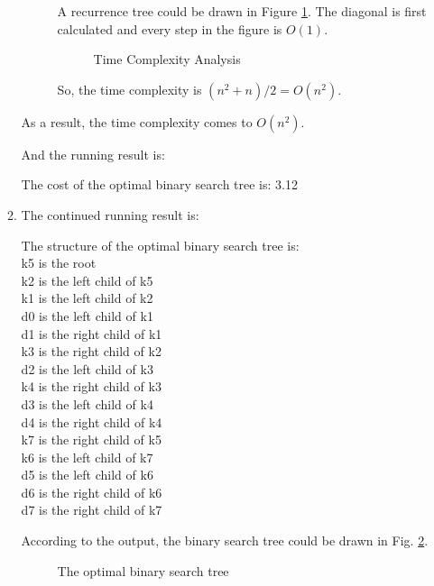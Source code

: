 \documentclass[12pt,a4paper]{article}
\theoremstyle{definition}
\begin{document}
\begin{enumerate}
\begin{enumerate}
\begin{description}
				A recurrence tree could be drawn in Figure \ref{fig:tc}. The diagonal is first calculated and every step in the figure is $O(1)$.
				\begin{figure}[h]
					\centering
					
					\caption{Time Complexity Analysis}
					\label{fig:tc}
				\end{figure}

				So, the time complexity is $(n^2+n)/2 = O(n^2)$.
			\end{description}
			As a result, the time complexity comes to $O(n^2)$.

			And the running result is:
			\begin{tcolorbox}
The cost of the optimal binary search tree is: 3.12
			\end{tcolorbox}

			\item The continued running result is:
			\begin{tcolorbox}
The structure of the optimal binary search tree is:\\
k5 is the root\\
k2 is the left child of k5\\
k1 is the left child of k2\\
d0 is the left child of k1\\
d1 is the right child of k1\\
k3 is the right child of k2\\
d2 is the left child of k3\\
k4 is the right child of k3\\
d3 is the left child of k4\\
d4 is the right child of k4\\
k7 is the right child of k5\\
k6 is the left child of k7\\
d5 is the left child of k6\\
d6 is the right child of k6\\
d7 is the right child of k7
			\end{tcolorbox}

			According to the output, the binary search tree could be drawn in Fig. \ref{fig:bst}.

			\begin{figure}[h]
				\centering
				
				\caption{The optimal binary search tree}
				\label{fig:bst}
			\end{figure}


\end{enumerate}
\end{enumerate}
\end{document}
